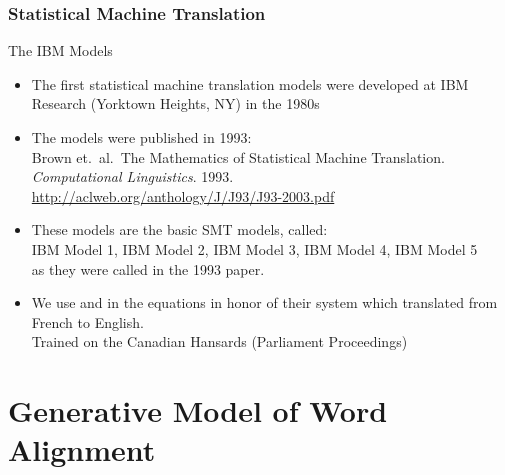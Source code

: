 \begin{frame}
\frametitle{Statistical Machine Translation}
\begin{block}{The IBM Models}
\begin{itemize}[<+->]
\item The first statistical machine translation models were developed at IBM Research (Yorktown Heights, NY) in the 1980s
\item The models were published in 1993: \\
{\small Brown et.\ al.\ The Mathematics of Statistical Machine Translation. \textit{Computational Linguistics}. 1993.} \\
{\small \url{http://aclweb.org/anthology/J/J93/J93-2003.pdf}}
\item These models are the basic SMT models, called: \\
IBM Model 1, IBM Model 2, IBM Model 3, IBM Model 4, IBM Model 5 \\
as they were called in the 1993 paper.
\item We use \tgt and \src in the equations in honor of their system which translated from French to English.\\
Trained on the Canadian Hansards (Parliament Proceedings)
\end{itemize}
\end{block}
\end{frame}

\section{Generative Model of Word Alignment}
\frame{\tableofcontents[currentsection]}

